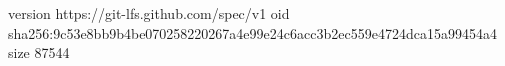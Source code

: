 version https://git-lfs.github.com/spec/v1
oid sha256:9c53e8bb9b4be070258220267a4e99e24c6acc3b2ec559e4724dca15a99454a4
size 87544
